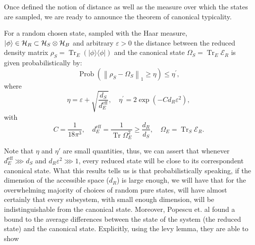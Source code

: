 \indent Once defined the notion of distance as well as the measure over which the states are sampled, we are ready to announce the theorem of canonical typicality.
\begin{theorem}
For a random chosen state, sampled with the Haar measure, $\mathinner{|{\phi}\rangle}\in\mathcal{H}_R\subset\mathcal{H}_S\otimes\mathcal{H}_B$ and arbitrary $\varepsilon >0$ the distance between the reduced density matrix $\rho_{S}=\operatorname{Tr}_{E}(|\phi\rangle\langle\phi|)$ and the canonical state $\Omega_S=\operatorname{Tr}_E\mathcal{E}_R$ is given probabilistically by:
\begin{equation}
\operatorname{Prob}\left(\left\|\rho_{S}-\Omega_{S}\right\|_{1} \geq \eta\right) \leq \eta^{\prime},
\label{CH1:Typicality_result_1}
\end{equation}
where
\begin{equation}
\eta=\varepsilon+\sqrt{\frac{d_{S}}{d_{E}^{\mathrm{eff}}}}, \quad \eta^{\prime}=2 \exp \left(-C d_{R} \varepsilon^{2}\right),
\label{CH1:Typicality_result_1_1}
\end{equation}
with
\begin{equation}
C=\frac{1}{18 \pi^{3}}, \quad d_{E}^{\mathrm{eff}}=\frac{1}{\operatorname{Tr} \Omega_{E}^{2}}\geq \frac{d_R}{d_S}, \quad \Omega_{E}=\operatorname{Tr}_{S} \mathcal{E}_{R}.
\label{CH1:Typicality_result_1_2}
\end{equation}
\end{theorem}

Note that $\eta$ and $\eta'$ are small quantities, thus, we can assert that whenever $d^{\mathrm{eff}}_E\ggg d_S$ and $d_R\varepsilon^2\ggg 1$, every reduced state will be close to its correspondent canonical state. What this results tells us is that probabilistically speaking, if the dimension of the accessible space ($d_R$) is large enough, we will have that for the overwhelming majority of choices of random pure states, will have almost certainly that every subsystem, with small enough dimension, will be indistinguishable from the canonical state. Moreover, Popescu et. al \cite{popescu_entanglement_2006} found a bound to the average differences between the state of the system (the reduced state) and the canonical state. Explicitly, using the levy lemma, they are able to show 

